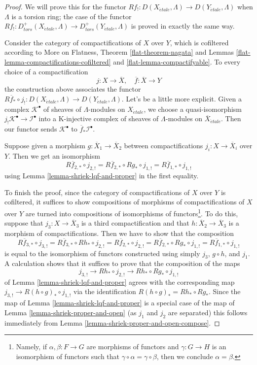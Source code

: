 \documentclass{stacks-project}
\theoremstyle{plain}
\theoremstyle{definition}
\theoremstyle{remark}
\numberwithin{equation}{subsection}
\def\etale{{\acute{e}tale}}
\begin{document}
\begin{proof}
We will prove this for the functor
$Rf_! : D(X_\etale, \Lambda) \to D(Y_\etale, \Lambda)$
when $\Lambda$ is a torsion ring; the case of the functor
$Rf_! : D^+_{tors}(X_\etale, \Lambda) \to D^+_{tors}(Y_\etale, \Lambda)$
is proved in exactly the same way.

\medskip\noindent
Consider the category of compactifications of $X$ over $Y$, which is
cofiltered according to More on Flatness, Theorem \ref{flat-theorem-nagata} and
Lemmas \ref{flat-lemma-compactifications-cofiltered} and
\ref{flat-lemma-compactifyable}.
To every choice of a compactification
$$
j : X \to \overline{X},\quad \overline{f} : \overline{X} \to Y
$$
the construction above associates the functor $R\overline{f}_* \circ j_! :
D(X_\etale, \Lambda) \to D(Y_\etale, \Lambda)$.
Let's be a little more explicit. Given a complex $\mathcal{K}^\bullet$
of sheaves of $\Lambda$-modules on $X_\etale$, we choose a quasi-isomorphism
$j_!\mathcal{K}^\bullet \to \mathcal{I}^\bullet$ into a K-injective
complex of sheaves of $\Lambda$-modules on $\overline{X}_\etale$.
Then our functor sends $\mathcal{K}^\bullet$ to
$\overline{f}_*\mathcal{I}^\bullet$.

\medskip\noindent
Suppose given a morphism $g : \overline{X}_1 \to \overline{X}_2$
between compactifications $j_i : X \to \overline{X}_i$ over $Y$.
Then we get an isomorphism
$$
R\overline{f}_{2, *} \circ j_{2, !} =
R\overline{f}_{2, *} \circ Rg_* \circ j_{1, !} =
R\overline{f}_{1, *} \circ j_{1, !}
$$
using Lemma \ref{lemma-shriek-lqf-and-proper} in the first equality.

\medskip\noindent
To finish the proof, since the category of compactifications of $X$ over $Y$
is cofiltered, it suffices to show compositions of morphisms of
compactifications of $X$ over $Y$ are turned into compositions of
isomorphisms of functors\footnote{Namely, if $\alpha, \beta : F \to G$
are morphisms of functors and $\gamma : G \to H$ is an isomorphism
of functors such that $\gamma \circ \alpha = \gamma \circ \beta$, then
we conclude $\alpha = \beta$.}. To do this, suppose that
$j_3 : X \to \overline{X}_3$
is a third compactification and that $h : \overline{X}_2 \to \overline{X}_3$
is a morphism of compactifications. Then we have to show that the
composition
$$
R\overline{f}_{3, *} \circ j_{3, !} =
R\overline{f}_{3, *} \circ Rh_* \circ j_{2, !} =
R\overline{f}_{2, *} \circ j_{2, !} =
R\overline{f}_{2, *} \circ Rg_* \circ j_{1, !} =
R\overline{f}_{1, *} \circ j_{1, !}
$$
is equal to the isomorphism of functors constructed using simply
$j_3$, $g \circ h$, and $j_1$. A calculation shows that it suffices to
prove that the composition of the maps
$$
j_{3, !} \to Rh_* \circ j_{2, !} \to Rh_* \circ Rg_* \circ j_{1, !}
$$
of Lemma \ref{lemma-shriek-lqf-and-proper} agrees with the corresponding
map $j_{3, !} \to R(h \circ g)_* \circ j_{1, !}$
via the identification $R(h \circ g)_* = Rh_* \circ Rg_*$.
Since the map of Lemma \ref{lemma-shriek-lqf-and-proper}
is a special case of the map of Lemma \ref{lemma-shriek-proper-and-open}
(as $j_1$ and $j_2$ are separated) this follows immediately from
Lemma \ref{lemma-shriek-proper-and-open-compose}.
\end{proof}
\end{document}
